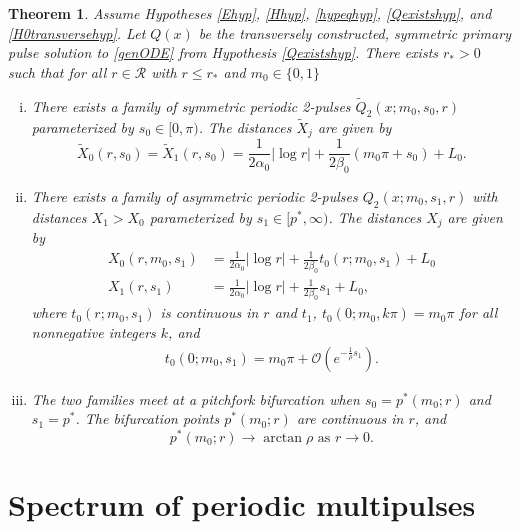 \documentclass[11pt,reqno]{amsart}
\theoremstyle{plain}
\newtheorem{theorem}{Theorem}
\theoremstyle{definition}
\theoremstyle{remark}
\begin{document}
\begin{theorem}\label{2pulsebifurcation}
Assume Hypotheses \ref{Ehyp}, \ref{Hhyp}, \ref{hypeqhyp}, \ref{Qexistshyp}, and \ref{H0transversehyp}. Let $Q(x)$ be the transversely constructed, symmetric primary pulse solution to \eqref{genODE} from Hypothesis \ref{Qexistshyp}. There exists $r_* > 0$ such that for all $r \in \mathcal{R}$ with $r \leq r_*$ and $m_0 \in \{0, 1\}$
\begin{enumerate}[(i)]
	\item There exists a family of symmetric periodic 2-pulses $\tilde{Q}_2(x; m_0, s_0, r)$ parameterized by $s_0 \in [0, \pi)$. The distances $\tilde{X}_j$ are given by
	\begin{equation}\label{2psymmdist}
		\tilde{X}_0(r, s_0) = \tilde{X}_1(r, s_0) = \frac{1}{2 \alpha_0} |\log r| + \frac{1}{2\beta_0} (m_0 \pi + s_0) + L_0.
	\end{equation}
	\item There exists a family of asymmetric periodic 2-pulses $Q_2(x; m_0, s_1, r)$ with distances $X_1 > X_0$ parameterized by $s_1 \in [p^*, \infty)$. The distances $X_j$ are given by
	\begin{equation}\label{2pasymmdist}
	\begin{aligned}
		X_0(r, m_0, s_1) &= \frac{1}{2 \alpha_0} |\log r| + \frac{1}{2\beta_0} t_0(r; m_0, s_1) + L_0 \\
		X_1(r, s_1) &= \frac{1}{2 \alpha_0} |\log r| + \frac{1}{2\beta_0} s_1 + L_0, 
	\end{aligned}
	\end{equation}
	where $t_0(r; m_0, s_1)$ is continuous in $r$ and $t_1$, $t_0(0; m_0, k \pi) = m_0 \pi$ for all nonnegative integers $k$, and 
	\begin{align}\label{deft0}
	t_0(0; m_0, s_1) = m_0 \pi + \mathcal{O}\left(e^{-\frac{1}{\rho} s_1 }\right).
	\end{align}

	\item The two families meet at a pitchfork bifurcation when $s_0 = p^*(m_0; r)$ and $s_1 = p^*$. The bifurcation points $p^*(m_0; r)$ are continuous in $r$, and
	\[
	p^*(m_0; r) \rightarrow \arctan \rho \text{ as }r \rightarrow 0.
	\]
\end{enumerate}
\end{theorem}

\section{Spectrum of periodic multipulses}\label{sec:perstab}
\end{document}
